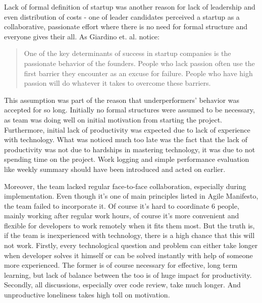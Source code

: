 \documentclass{article}
\begin{document}
Lack of formal definition of startup \cite{paternoster2014software} was another reason for lack of leadership and even distribution of costs - one of leader candidates perceived a startup as a collaborative, passionate effort where there is no need for formal structure and everyone gives their all. As Giardino et. al. \cite{giardino2014early} notice:
\begin{quote}
  One of the key determinants of success in startup companies is the passionate behavior of the founders. People who lack passion often use the first barrier they encounter as an excuse for failure. People who have high passion will do whatever it takes to overcome these barriers.
\end{quote}

This assumption was part of the reason that underperformers' behavior was accepted for so long. Initially no formal structures were assumed to be necessary, as team was doing well on initial motivation from starting the project. Furthermore, initial lack of productivity was expected due to lack of experience with technology. What was noticed much too late was the fact that the lack of productivity was not due to hardships in mastering technology, it was due to not spending time on the project. Work logging and simple performance evaluation like weekly summary should have been introduced and acted on earlier.

Moreover, the team lacked regular face-to-face collaboration, especially during implementation. Even though it's one of main principles listed in Agile Manifesto, the team failed to incorporate it. Of course it's hard to coordinate 6 people, mainly working after regular work hours, of course it's more convenient and flexible for developers to work remotely when it fits them most. But the truth is, if the team is inexperienced with technology, there is a high chance that this will not work. Firstly, every technological question and problem can either take longer when developer solves it himself or can be solved instantly with help of someone more experienced. The former is of course necessary for effective, long term learning, but lack of balance between the too is of huge impact for productivity. Secondly, all discussions, especially over code review, take much longer. And unproductive loneliness takes high toll on motivation.
\end{document}
